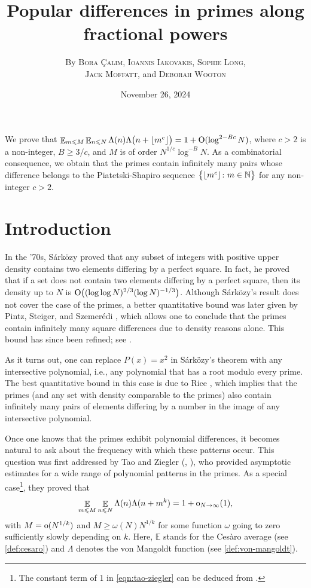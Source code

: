 \documentclass[letterpaper, 12pt]{article}
\title{\bfseries Popular differences in primes along fractional powers}
\date{\small{November 26, 2024}}
\author{By {\scshape Bora \c{C}al{\i}m}, {\scshape Ioannis Iakovakis}, {\scshape Sophie Long,}\\
{\scshape Jack Moffatt}, and {\scshape Deborah Wooton}}
\makeatletter
\renewenvironment{abstract}{
    \begin{center}
        {\bfseries \large\abstractname\vspace{\z@}}
    \end{center}
    \quotation
}
{\endquotation}
\theoremstyle{plain}
\theoremstyle{definition}
\theoremstyle{plain}
\theoremstyle{plain}
\numberwithin{equation}{section}
\newcommand{\Cesaro}{Ces\`{a}ro}
\newcommand{\Szemeredi}{Szemer\'{e}di}
\newcommand{\Sarkozy}{S\'{a}rk\"{o}zy}
\newcommand{\Oh}{{\rm O}}
\newcommand{\oh}{{\rm o}}
\newcommand{\N}{\mathbb{N}}
\renewcommand{\leq}{\leqslant}
\renewcommand{\geq}{\geqslant}
\newcommand{\E}{\mathbb{E}}
\newcommand{\1}{\textbf{1}}
\DeclarePairedDelimiter\floor{\lfloor}{\rfloor}
\makeatother
\begin{document}
\maketitle

\begin{abstract}
    We prove that $\mathop{\E}_{m \leq M} \mathop{\E}_{n \leq N} \Lambda(n) \Lambda\bigl(n + \floor{m^c}\bigr) = 1 + \Oh(\log^{2 - Bc} N)$, where $c > 2$ is a non-integer, $B \geq 3/c$, and $M$ is of order $N^{1/c} \log^{-B} N$. As a combinatorial consequence, we obtain that the primes contain infinitely many pairs whose difference belongs to the Piatetski-Shapiro sequence $\bigl\{\floor{m^c} \colon m \in \N \bigr\}$ for any non-integer $c > 2$.
\end{abstract}

\section{Introduction}

In the '70s, \Sarkozy{} \cite{sarkozy1978} proved that any subset of integers with positive upper density contains two elements differing by a perfect square. In fact, he proved that if a set does not contain two elements differing by a perfect square, then its density up to $N$ is $\Oh\bigl((\log\log N)^{2/3} (\log N)^{-1/3}\bigr)$. Although \Sarkozy{}'s result does not cover the case of the primes, a better quantitative bound was later given by Pintz, Steiger, and \Szemeredi{} \cite{pintzSteigSzemeredi1988}, which allows one to conclude that the primes contain infinitely many square differences due to density reasons alone. This bound has since been refined; see \cite{bloomMaynard2022}.

As it turns out, one can replace $P(x) = x^2$ in \Sarkozy{}'s theorem with any intersective polynomial, i.e., any polynomial that has a root modulo every prime. The best quantitative bound in this case is due to Rice \cite{rice2019}, which implies that the primes (and any set with density comparable to the primes) also contain infinitely many pairs of elements differing by a number in the image of any intersective polynomial.

Once one knows that the primes exhibit polynomial differences, it becomes natural to ask about the frequency with which these patterns occur. This question was first addressed by Tao and Ziegler (\cite{taoZiegler2008}, \cite{taoZiegler2018}), who provided asymptotic estimates for a wide range of polynomial patterns in the primes. As a special case\footnote{The constant term of 1 in \cref{eqn:tao-ziegler} can be deduced from \cite[Theorem 4]{taoZiegler2018}.}, they proved that
\begin{equation}\label{eqn:tao-ziegler}
    \mathop{\E}_{m \leq M} \mathop{\E}_{n \leq N} \Lambda(n) \Lambda(n + m^k) 
    = 1 + \oh_{N\to\infty}(1),
\end{equation}
with $M = \oh(N^{1/k})$ and $M \geq \omega(N)N^{1/k}$ for some function $\omega$ going to zero sufficiently slowly depending on $k$. Here, $\E$ stands for the \Cesaro{} average (see \cref{def:cesaro}) and $\Lambda$ denotes the von Mangoldt function (see \cref{def:von-mangoldt}).
\end{document}
